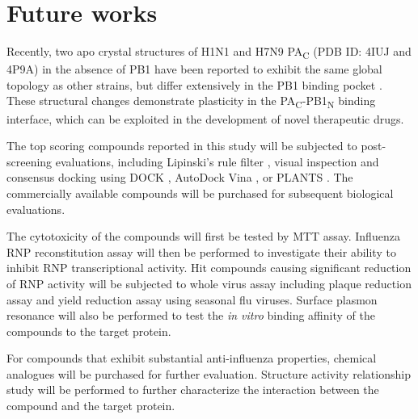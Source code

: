 \section{Future works}

Recently, two apo crystal structures of H1N1 and H7N9 PA\textsubscript{C} (PDB ID: 4IUJ and 4P9A) in the absence of PB1 have been reported to exhibit the same global topology as other strains, but differ extensively in the PB1 binding pocket \citep{1585}. These structural changes demonstrate plasticity in the PA\textsubscript{C}-PB1\textsubscript{N} binding interface, which can be exploited in the development of novel therapeutic drugs.

The top scoring compounds reported in this study will be subjected to post-screening evaluations, including Lipinski's rule filter \citep{169}, visual inspection and consensus docking \citep{1590} using DOCK \citep{1222}, AutoDock Vina \citep{595}, or PLANTS \citep{610,607,779}. The commercially available compounds will be purchased for subsequent biological evaluations.

The cytotoxicity of the compounds will first be tested by MTT assay. Influenza RNP reconstitution assay will then be performed to investigate their ability to inhibit RNP transcriptional activity. Hit compounds causing significant reduction of RNP activity will be subjected to whole virus assay including plaque reduction assay and yield reduction assay using seasonal flu viruses. Surface plasmon resonance will also be performed to test the \textit{in vitro} binding affinity of the compounds to the target protein. 

For compounds that exhibit substantial anti-influenza properties, chemical analogues will be purchased for further evaluation. Structure activity relationship study will be performed to further characterize the interaction between the compound and the target protein.


\chapterend
